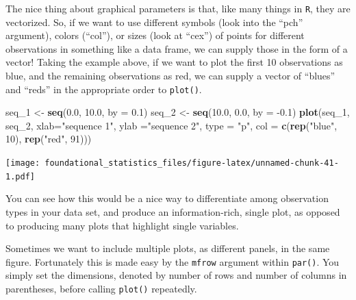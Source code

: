\documentclass[]{book}
\newenvironment{Shaded}{\begin{snugshade}}{\end{snugshade}}
\newcommand{\DataTypeTok}[1]{\textcolor[rgb]{0.13,0.29,0.53}{#1}}
\newcommand{\DecValTok}[1]{\textcolor[rgb]{0.00,0.00,0.81}{#1}}
\newcommand{\FloatTok}[1]{\textcolor[rgb]{0.00,0.00,0.81}{#1}}
\newcommand{\KeywordTok}[1]{\textcolor[rgb]{0.13,0.29,0.53}{\textbf{#1}}}
\newcommand{\NormalTok}[1]{#1}
\newcommand{\StringTok}[1]{\textcolor[rgb]{0.31,0.60,0.02}{#1}}
\begin{document}
The nice thing about graphical parameters is that, like many things in \texttt{R}, they are vectorized. So, if we want to use different symbols (look into the ``pch'' argument), colors (``col''), or sizes (look at ``cex'') of points for different observations in something like a data frame, we can supply those in the form of a vector! Taking the example above, if we want to plot the first 10 observations as blue, and the remaining observations as red, we can supply a vector of ``blues'' and ``reds'' in the appropriate order to \texttt{plot()}.

\begin{Shaded}
\begin{Highlighting}[]
\NormalTok{seq_}\DecValTok{1}\NormalTok{ <-}\StringTok{ }\KeywordTok{seq}\NormalTok{(}\FloatTok{0.0}\NormalTok{, }\FloatTok{10.0}\NormalTok{, }\DataTypeTok{by =} \FloatTok{0.1}\NormalTok{)}
\NormalTok{seq_}\DecValTok{2}\NormalTok{ <-}\StringTok{ }\KeywordTok{seq}\NormalTok{(}\FloatTok{10.0}\NormalTok{, }\FloatTok{0.0}\NormalTok{, }\DataTypeTok{by =} \FloatTok{-0.1}\NormalTok{)}
\KeywordTok{plot}\NormalTok{(seq_}\DecValTok{1}\NormalTok{, seq_}\DecValTok{2}\NormalTok{, }\DataTypeTok{xlab=}\StringTok{"sequence 1"}\NormalTok{, }\DataTypeTok{ylab =}\StringTok{"sequence 2"}\NormalTok{, }\DataTypeTok{type =} \StringTok{"p"}\NormalTok{, }
     \DataTypeTok{col =} \KeywordTok{c}\NormalTok{(}\KeywordTok{rep}\NormalTok{(}\StringTok{"blue"}\NormalTok{, }\DecValTok{10}\NormalTok{), }\KeywordTok{rep}\NormalTok{(}\StringTok{"red"}\NormalTok{, }\DecValTok{91}\NormalTok{)))}
\end{Highlighting}
\end{Shaded}

\texttt{[image: foundational\_statistics\_files/figure-latex/unnamed-chunk-41-1.pdf]}

You can see how this would be a nice way to differentiate among observation types in your data set, and produce an information-rich, single plot, as opposed to producing many plots that highlight single variables.

Sometimes we want to include multiple plots, as different panels, in the same figure. Fortunately this is made easy by the \texttt{mfrow} argument within \texttt{par()}. You simply set the dimensions, denoted by number of rows and number of columns in parentheses, before calling \texttt{plot()} repeatedly.
\end{document}
